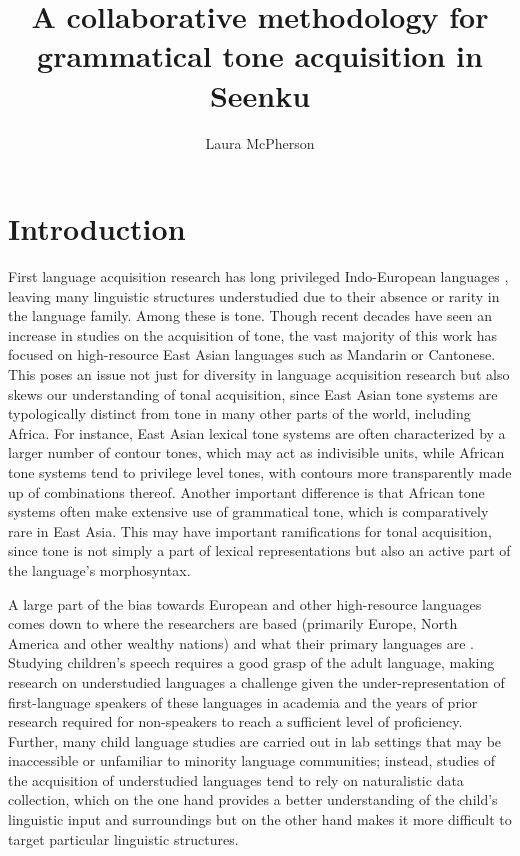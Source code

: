 \documentclass[output=paper,colorlinks,citecolor=brown,
]{langscibook}
\author{Laura McPherson\affiliation{Dartmouth College}}
\title{A collaborative methodology for grammatical tone acquisition in Seenku}
\begin{document}
\maketitle

\section{Introduction}

First language acquisition research has long privileged Indo-European languages \citep{KiddGarcia22}, leaving many linguistic structures understudied due to their absence or rarity in the language family. Among these is tone. Though recent decades have seen an increase in studies on the acquisition of tone, the vast majority of this work has focused on high-resource East Asian languages such as Mandarin or Cantonese. This poses an issue not just for diversity in language acquisition research but also skews our understanding of tonal acquisition, since East Asian tone systems are typologically distinct from tone in many other parts of the world, including Africa. For instance, East Asian lexical tone systems are often characterized by a larger number of contour tones, which may act as indivisible units, while African tone systems tend to privilege level tones, with contours more transparently made up of combinations thereof. Another important difference is that African tone systems often make extensive use of grammatical tone, which is comparatively rare in East Asia. This may have important ramifications for tonal acquisition, since tone is not simply a part of lexical representations but also an active part of the language's morphosyntax. 

A large part of the bias towards European and other high-resource languages comes down to where the researchers are based (primarily Europe, North America and other wealthy nations) and what their primary languages are \citep{KiddGarcia22}. Studying children's speech requires a good grasp of the adult language, making research on understudied languages a challenge given the under-representation of first-language speakers of these languages in academia and the years of prior research required for non-speakers to reach a sufficient level of proficiency. Further, many child language studies are carried out in lab settings that may be inaccessible or unfamiliar to minority language communities; instead, studies of the acquisition of understudied languages tend to rely on naturalistic data collection, which on the one hand provides a better understanding of the child's linguistic input and surroundings but on the other hand makes it more difficult to target particular linguistic structures. 
\end{document}
